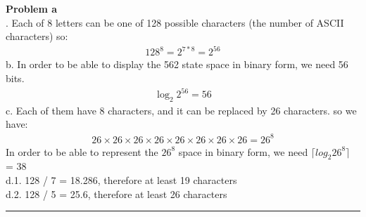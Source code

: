 \documentclass[a4paper, 11pt]{article}
\newenvironment{problem}[2][Problem]
    { \begin{mdframed}[backgroundcolor=gray!20] \textbf{#1 #2} \\}
    {  \end{mdframed}}
\begin{document}
\begin{problem}{2}
a. Each of 8 letters can be one of 128 possible characters  (the number of ASCII characters) so:
\begin{align*}
    128 ^ 8 = 2 ^{7*8} = 2^{56}
\end{align*}
b. In order to be able to display the 562 state space in binary form, we need 56 bits.
\begin{align*}
    \log_2 2^{56} = 56
\end{align*}
c. Each of them have 8 characters, and it can be replaced by 26 characters. so we have:
\begin{align*}
    26 \times 26 \times 26 \times 26 \times 26 \times 26 \times 26 \times 26 = 26 ^ 8
\end{align*}
In order to be able to represent the $26^{8}$ space in binary form, we need
$\lceil log_2 26^{8} \rceil$ = 38\\
d.1. 128 / 7 = 18.286, therefore at least 19 characters\\
d.2. 128 / 5 = 25.6, therefore at least 26 characters
\end{problem}
\noindent\rule{7in}{2.8pt}

\end{document}
